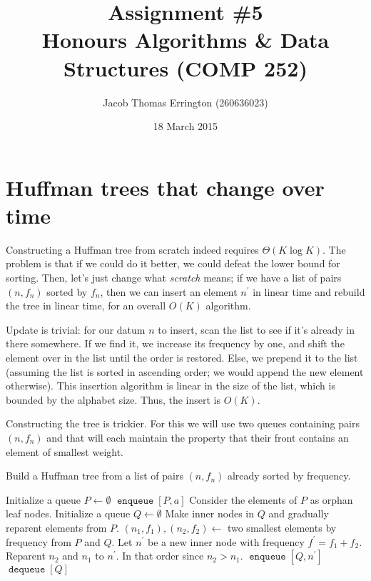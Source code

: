 \documentclass{article}
\title{Assignment \#5\\Honours Algorithms \& Data Structures (COMP 252)}
\author{Jacob Thomas Errington (260636023)}
\date{18 March 2015}
\DeclareMathOperator{\enqueue}{\mathtt{enqueue}}
\DeclareMathOperator{\dequeue}{\mathtt{dequeue}}
\begin{document}
\maketitle

\section{Huffman trees that change over time}

Constructing a Huffman tree from scratch indeed requires $\Theta{(K \log K)}$.
The problem is that if we could do it better, we could defeat the lower bound
for sorting. Then, let's just change what \emph{scratch} means; if we have a
list of pairs $(n, f_n)$ sorted by $f_n$, then we can insert an element
$n^\prime$ in linear time and rebuild the tree in linear time, for an overall
$O(K)$ algorithm.

Update is trivial: for our datum $n$ to insert, scan the list to see if it's
already in there somewhere. If we find it, we increase its frequency by one,
and shift the element over in the list until the order is restored. Else, we
prepend it to the list (assuming the list is sorted in ascending order; we
would append the new element otherwise). This insertion algorithm is linear in
the size of the list, which is bounded by the alphabet size. Thus, the insert
is $O(K)$.

Constructing the tree is trickier. For this we will use two queues containing
pairs $(n, f_n)$ and that will each maintain the property that their front
contains an element of smallest weight.

\begin{algorithm}[H]
    \caption{Build a Huffman tree from a list of pairs $(n, f_n)$ already
        sorted by frequency.}
    \begin{algorithmic}

            \State Initialize a queue $P \gets \emptyset$
                \State $\enqueue{[P, a]}$
            \EndFor
            \State \Comment Consider the elements of $P$ as orphan leaf nodes.
            \State Initialize a queue $Q \gets \emptyset$
            \State \Comment Make inner nodes in $Q$ and gradually reparent
                elements from $P$.
                \State $(n_1, f_1), (n_2, f_2) \gets$ two smallest
                    elements by frequency from $P$ and $Q$.
                \State Let $n^\prime$ be a new inner node with frequency
                    $f^\prime = f_1 + f_2$.
                \State Reparent $n_2$ and $n_1$ to $n^\prime$.
                    \Comment In that order since $n_2 > n_1$.
                \State $\enqueue{[Q, n^\prime]}$
            \EndWhile
            \State \Return $\dequeue{[Q]}$
        \EndFunction
    \end{algorithmic}
\end{algorithm}
\end{document}
